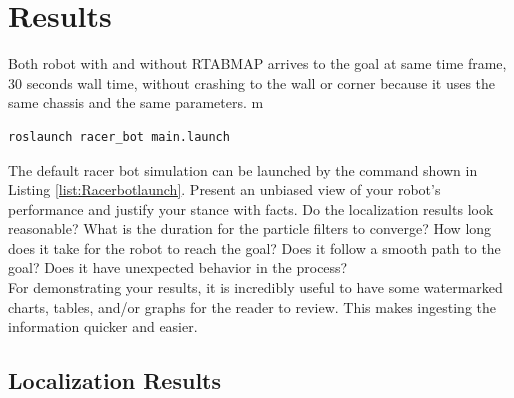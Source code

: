 \documentclass[10pt,journal,compsoc]{IEEEtran}
\begin{document}
\section{Results}
Both robot with and without RTABMAP arrives to the goal at same time frame, 30 seconds wall time, without crashing to the wall or corner because it uses the same chassis and the same parameters.
m
\begin{lstlisting}[language={[Sharp]C}, caption={racerbot launch command},label={list:Racerbotlaunch}]
      roslaunch racer_bot main.launch
\end{lstlisting}
The default racer bot simulation can be launched by the command shown in Listing \ref{list:Racerbotlaunch}.
Present an unbiased view of your robot's performance and justify your stance with facts. Do the localization results look reasonable? What is the duration for the particle filters to converge? How long does it take for the robot to reach the goal? Does it follow a smooth path to the goal? Does it have unexpected behavior in the process? \\
For demonstrating your results, it is incredibly useful to have some watermarked charts, tables, and/or graphs for the reader to review. This makes ingesting the information quicker and easier.
\subsection{Localization Results}
\end{document}
